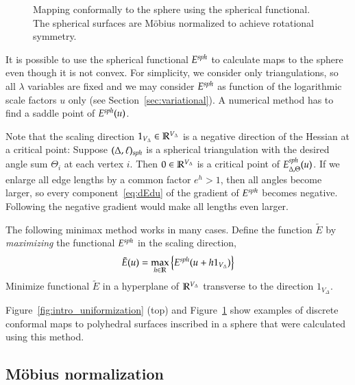 \documentclass[Thesis]{subfiles}
\begin{document}
\begin{figure}
\centering
{}
\caption{Mapping conformally to the sphere using the spherical
  functional. The spherical surfaces are M{\"o}bius normalized to
  achieve rotational symmetry.}
\label{fig:spherical_examples}
\end{figure}

It is possible to use the spherical functional $E^{\mathit{sph}}$ to calculate
maps to the sphere even though it is not convex. For simplicity, we
consider only triangulations, so all $\lambda$ variables are fixed and
we may consider $E^{\mathit{sph}}$ as function of the logarithmic scale
factors $u$ only (see Section~\ref{sec:variational}). A numerical
method has to find a saddle point of $E^{\mathit{sph}}(u)$. 

Note that the scaling direction $1_{V_{\Delta}}\in\mathbb R^{V_{\Delta}}$ is
a negative direction of the Hessian at a critical point: Suppose
$(\Delta,\ell)_{\mathit{sph}}$ is a spherical triangulation with the desired
angle sum $\Theta_{i}$ at each vertex $i$. Then $0\in\mathbb R^{V_{\Delta}}$
is a critical point of $E^{\mathit{sph}}_{\Delta,\Theta}(u)$. If we enlarge
all edge lengths by a common factor $e^{h}>1$, then all angles become
larger, so every component~\eqref{eq:dEdu} of the gradient of
$E^{\mathit{sph}}$ becomes negative. Following the negative gradient would
make all lengths even larger.

The following minimax method works in many cases. Define the function
$\tilde E$ by \emph{maximizing} the functional $E^{\mathit{sph}}$ in the
scaling direction,
\begin{equation}
\label{eq:reduced_spherical}
\tilde E(u)=\max_{h\in\mathbb R} \left\{E^{\mathit{sph}}(u + h1_{V_{\Delta}})\right\}
\end{equation}
Minimize functional $\tilde E$ in a hyperplane of $\mathbb R^{V_{\Delta}}$
transverse to the direction $1_{V_{\Delta}}$.

Figure~\ref{fig:intro_uniformization} (top) and
Figure~\ref{fig:spherical_examples} show examples of discrete
conformal maps to polyhedral surfaces inscribed in a sphere that were
calculated using this method.

\subsection{M{\"o}bius normalization}
\label{sec:moebius_normalization}
\end{document}
